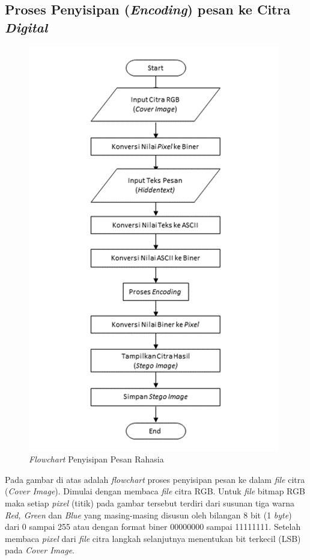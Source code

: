 	\subsection{Proses Penyisipan (\emph{Encoding}) pesan ke Citra \emph{Digital}}
	
	\begin{figure}[H]
		\centering
		\includegraphics[height=0.8\textheight]{gambar/penyisipan3}
		\caption{\emph{Flowchart} Penyisipan Pesan Rahasia}
		\label{flowchart_penyisipan}
	\end{figure}

	Pada gambar di atas adalah \emph{flowchart} proses penyisipan pesan ke dalam \emph{file}
	citra (\emph{Cover Image}). Dimulai dengan membaca \emph{file} citra RGB. Untuk \emph{file} bitmap RGB maka setiap \emph{pixel} (titik) pada gambar tersebut terdiri dari susunan tiga warna \emph{Red, Green} dan \emph{Blue} yang masing-masing disusun oleh bilangan 8 bit (1 \emph{byte}) dari 0 sampai 255 atau dengan format biner 00000000 sampai 11111111. Setelah membaca \emph{pixel} dari \emph{file} citra langkah selanjutnya menentukan bit terkecil (LSB) pada \emph{Cover Image}.
	

